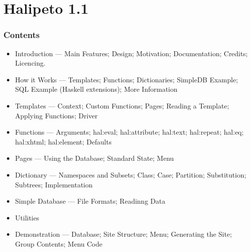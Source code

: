 \documentclass[a4paper,11pt]{article}
\begin{document}
\part{Halipeto 1.1}

\section{Contents}

\begin{itemize}

\item Introduction --- Main Features; Design; Motivation;
Documentation; Credits; Licencing.

\item How it Works --- Templates; Functions; Dictionaries; SimpleDB
Example; SQL Example (Haskell extensions); More Information

\item Templates --- Context; Custom Functions; Pages; Reading a
Template; Applying Functions; Driver

\item Functions --- Arguments; hal:eval; hal:attribute; hal:text;
hal:repeat; hal:eq; hal:xhtml; hal:element; Defaults

\item Pages --- Using the Database; Standard State; Menu

\item Dictionary --- Namespaces and Subsets; Class; Case; Partition;
Substitution; Subtrees; Implementation

\item Simple Database --- File Formats; Readinng Data

\item Utilities

\item Demonstration --- Database; Site Structure; Menu; Generating the
Site; Group Contents; Menu Code

\end{itemize}



\vfill\eject



\vfill\eject



\vfill\eject



\vfill\eject



\vfill\eject



\vfill\eject



\vfill\eject



\vfill\eject


\end{document}
